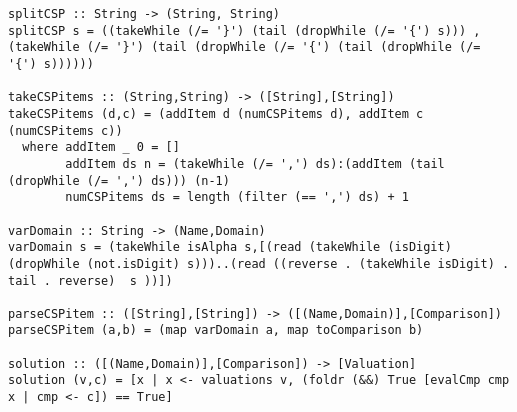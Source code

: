 \documentclass[a4paper,11pt]{article}
\begin{document}
\begin{lstlisting}
splitCSP :: String -> (String, String)
splitCSP s = ((takeWhile (/= '}') (tail (dropWhile (/= '{') s))) , (takeWhile (/= '}') (tail (dropWhile (/= '{') (tail (dropWhile (/= '{') s))))))

takeCSPitems :: (String,String) -> ([String],[String])
takeCSPitems (d,c) = (addItem d (numCSPitems d), addItem c (numCSPitems c))
  where addItem _ 0 = []
        addItem ds n = (takeWhile (/= ',') ds):(addItem (tail (dropWhile (/= ',') ds))) (n-1)
        numCSPitems ds = length (filter (== ',') ds) + 1

varDomain :: String -> (Name,Domain)
varDomain s = (takeWhile isAlpha s,[(read (takeWhile (isDigit) (dropWhile (not.isDigit) s)))..(read ((reverse . (takeWhile isDigit) . tail . reverse)  s ))])

parseCSPitem :: ([String],[String]) -> ([(Name,Domain)],[Comparison])
parseCSPitem (a,b) = (map varDomain a, map toComparison b)

solution :: ([(Name,Domain)],[Comparison]) -> [Valuation]
solution (v,c) = [x | x <- valuations v, (foldr (&&) True [evalCmp cmp x | cmp <- c]) == True]
\end{lstlisting}
\end{document}
